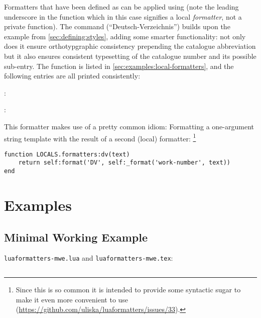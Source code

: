 \documentclass[12pt]{scrartcl}
\begin{document}
Formatters that have been defined as 
can be applied using  (note the leading
underscore in the function which in this case signifies a local
\emph{formatter}, not a private function). The command 
(“Deutsch-Verzeichnis”) builds upon the  example from
\vref{sec:defining:styles}, adding some smarter functionality: not only does it
ensure orthotypgraphic consistency prepending the catalogue abbreviation but it
also ensures consistent typesetting of the catalogue number and its possible
sub-entry.  The function is listed in \vref{sec:examples:local-formatters}, and
the following entries are all printed consistently:

\begin{itemize*}
\item {}
\item {}
\item \texttt{}: 
\item \texttt{}: 
\end{itemize*}

\noindent This formatter makes use of a pretty common idiom: Formatting a one-argument string template with the result of a second (local) formatter:%
\footnote{Since this is so common it is intended to provide some syntactic sugar
to make it even more convenient to use
(\url{https://github.com/uliska/luaformatters/issues/33}).}

\begin{verbatim}
function LOCALS.formatters:dv(text)
    return self:format('DV', self:_format('work-number', text))
end
\end{verbatim}


\section{Examples}
\label{sec:examples}

\subsection{Minimal Working Example}
\label{sec:examples:mwe}

\noindent
\texttt{luaformatters-mwe.lua} and \texttt{luaformatters-mwe.tex}:

\inputminted{lua}{examples/luaformatters-mwe.lua}
\end{document}
